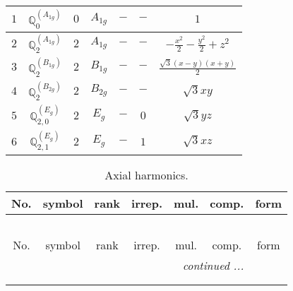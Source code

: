 \documentclass[fleqn,10pt,landscape]{article}
\begin{document}
\begin{itemize}
\begin{center}
\begin{longtable}{ccccccc}
$ 1 $ & $ \mathbb{Q}_{0}^{(A_{1g})} $ & $ 0 $ & $ A_{1g} $ & $ - $ & $ - $ & $ 1 $ \\ \hline
$ 2 $ & $ \mathbb{Q}_{2}^{(A_{1g})} $ & $ 2 $ & $ A_{1g} $ & $ - $ & $ - $ & $ - \frac{x^{2}}{2} - \frac{y^{2}}{2} + z^{2} $ \\
$ 3 $ & $ \mathbb{Q}_{2}^{(B_{1g})} $ & $ 2 $ & $ B_{1g} $ & $ - $ & $ - $ & $ \frac{\sqrt{3} \left(x - y\right) \left(x + y\right)}{2} $ \\
$ 4 $ & $ \mathbb{Q}_{2}^{(B_{2g})} $ & $ 2 $ & $ B_{2g} $ & $ - $ & $ - $ & $ \sqrt{3} x y $ \\
$ 5 $ & $ \mathbb{Q}_{2,0}^{(E_{g})} $ & $ 2 $ & $ E_{g} $ & $ - $ & $ 0 $ & $ \sqrt{3} y z $ \\
$ 6 $ & $ \mathbb{Q}_{2,1}^{(E_{g})} $ & $ 2 $ & $ E_{g} $ & $ - $ & $ 1 $ & $ \sqrt{3} x z $ \\
\end{longtable}
\end{center}
\begin{center}
\renewcommand{\arraystretch}{1.3}
\begin{longtable}{ccccccc}
\caption{Axial harmonics.}
 \\
 \hline \hline
No. & symbol & rank & irrep. & mul. & comp. & form \\ \hline \endfirsthead

\multicolumn{6}{l}{\tablename\ \thetable{}} \\
 \hline \hline
No. & symbol & rank & irrep. & mul. & comp. & form \\ \hline \endhead

 \hline \hline
\multicolumn{6}{r}{\footnotesize\it continued ...} \\ \endfoot

 \hline \hline
\multicolumn{6}{r}{} \\ \endlastfoot


\end{longtable}
\end{center}
\end{itemize}
\end{document}
